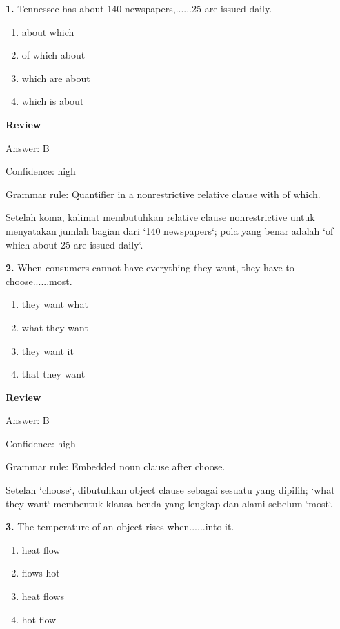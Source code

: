 \documentclass[12pt]{article}
\begin{document}
\noindent\textbf{1.} Tennessee has about 140 newspapers,......25 are issued daily.
\begin{enumerate}[label=(\Alph*),leftmargin=*,itemsep=0.2em]
\item about which
\item of which about
\item which are about
\item which is about
\end{enumerate}
\par
\begingroup
\setlength{\parskip}{0pt}
\setlength{\parindent}{0pt}
\textbf{Review}\par
Answer: B\par
Confidence: high\par
Grammar rule: Quantifier in a nonrestrictive relative clause with of which.\par
Setelah koma, kalimat membutuhkan relative clause nonrestrictive untuk menyatakan jumlah bagian dari `140 newspapers`; pola yang benar adalah `of which about 25 are issued daily`.\par
\endgroup
\par
\vspace{0.25\baselineskip}
\noindent\textbf{2.} When consumers cannot have everything they want, they have to choose......most.
\begin{enumerate}[label=(\Alph*),leftmargin=*,itemsep=0.2em]
\item they want what
\item what they want
\item they want it
\item that they want
\end{enumerate}
\par
\begingroup
\setlength{\parskip}{0pt}
\setlength{\parindent}{0pt}
\textbf{Review}\par
Answer: B\par
Confidence: high\par
Grammar rule: Embedded noun clause after choose.\par
Setelah `choose`, dibutuhkan object clause sebagai sesuatu yang dipilih; `what they want` membentuk klausa benda yang lengkap dan alami sebelum `most`.\par
\endgroup
\par
\vspace{0.25\baselineskip}
\noindent\textbf{3.} The temperature of an object rises when......into it.
\begin{enumerate}[label=(\Alph*),leftmargin=*,itemsep=0.2em]
\item heat flow
\item flows hot
\item heat flows
\item hot flow
\end{enumerate}
\end{document}
